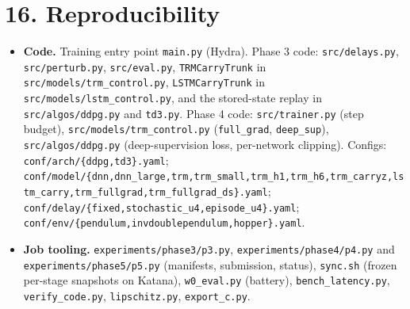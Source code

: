 \documentclass[11pt]{article}
\begin{document}
\medskip



\section*{16. Reproducibility}



\begin{itemize}
\item \textbf{Code.} Training entry point \texttt{main.py} (Hydra). Phase 3 code: \texttt{src/delays.py}, \texttt{src/\allowbreak{}perturb.\allowbreak{}py}, \texttt{src/eval.py}, \texttt{TRMCarryTrunk} in \texttt{src/\allowbreak{}models/\allowbreak{}trm\_\allowbreak{}control.\allowbreak{}py}, \texttt{LSTMCarryTrunk} in \texttt{src/\allowbreak{}models/\allowbreak{}lstm\_\allowbreak{}control.\allowbreak{}py}, and the stored-state replay in \texttt{src/\allowbreak{}algos/\allowbreak{}ddpg.\allowbreak{}py} and \texttt{td3.py}. Phase 4 code: \texttt{src/\allowbreak{}trainer.\allowbreak{}py} (step budget), \texttt{src/\allowbreak{}models/\allowbreak{}trm\_\allowbreak{}control.\allowbreak{}py} (\texttt{full\_grad}, \texttt{deep\_sup}), \texttt{src/\allowbreak{}algos/\allowbreak{}ddpg.\allowbreak{}py} (deep-supervision loss, per-network clipping). Configs: \texttt{conf/\allowbreak{}arch/\allowbreak{}\{ddpg,\allowbreak{}td3\}.\allowbreak{}yaml}; \texttt{conf/\allowbreak{}model/\allowbreak{}\{dnn,\allowbreak{}dnn\_\allowbreak{}large,\allowbreak{}trm,\allowbreak{}trm\_\allowbreak{}small,\allowbreak{}trm\_\allowbreak{}h1,\allowbreak{}trm\_\allowbreak{}h6,\allowbreak{}trm\_\allowbreak{}carryz,\allowbreak{}lstm\_\allowbreak{}carry,\allowbreak{}trm\_\allowbreak{}fullgrad,\allowbreak{}trm\_\allowbreak{}fullgrad\_\allowbreak{}ds\}.\allowbreak{}yaml}; \texttt{conf/\allowbreak{}delay/\allowbreak{}\{fixed,\allowbreak{}stochastic\_\allowbreak{}u4,\allowbreak{}episode\_\allowbreak{}u4\}.\allowbreak{}yaml}; \texttt{conf/\allowbreak{}env/\allowbreak{}\{pendulum,\allowbreak{}invdoublependulum,\allowbreak{}hopper\}.\allowbreak{}yaml}.
\item \textbf{Job tooling.} \texttt{experiments/\allowbreak{}phase3/\allowbreak{}p3.\allowbreak{}py}, \texttt{experiments/\allowbreak{}phase4/\allowbreak{}p4.\allowbreak{}py} and \texttt{experiments/\allowbreak{}phase5/\allowbreak{}p5.\allowbreak{}py} (manifests, submission, status), \texttt{sync.sh} (frozen per-stage snapshots on Katana), \texttt{w0\_eval.py} (battery), \texttt{bench\_\allowbreak{}latency.\allowbreak{}py}, \texttt{verify\_\allowbreak{}code.\allowbreak{}py}, \texttt{lipschitz.py}, \texttt{export\_c.py}.

\end{itemize}
\end{document}
